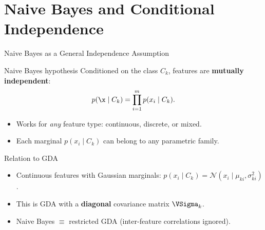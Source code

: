\section{Naive Bayes and Conditional Independence}

\begin{frame}{Naive Bayes as a General Independence Assumption}
  \begin{block}{Naive Bayes hypothesis}
    Conditioned on the class $C_k$, features are \textbf{mutually independent}:
    \[
      p(\x\mid C_k)=\prod_{i=1}^m p(x_i\mid C_k).
    \]
    \begin{itemize}
      \item Works for \emph{any} feature type: continuous, discrete, or mixed.
      \item Each marginal $p(x_i\mid C_k)$ can belong to any parametric family.
    \end{itemize}
  \end{block}

  \begin{block}{Relation to GDA}
    \begin{itemize}
      \item Continuous features with Gaussian marginals:
            $p(x_i\mid C_k)=\mathcal{N}(x_i\mid\mu_{ki},\sigma_{ki}^2)$.
      \item This is GDA with a \textbf{diagonal} covariance matrix $\VSigma_k$.
      \item Naive Bayes $\equiv$ restricted GDA (inter-feature correlations ignored).
    \end{itemize}
  \end{block}
\end{frame}

